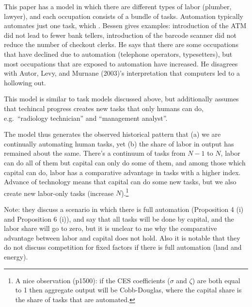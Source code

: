 \documentclass[
  11pt,
  letterpaper,
  DIV=11,
  numbers=noendperiod,
  oneside]{scrartcl}
\providecommand{\tightlist}{%
  \setlength{\itemsep}{0pt}\setlength{\parskip}{0pt}}\usepackage{longtable,booktabs,array}
\begin{document}
\begin{description}
\tightlist
\item[J. E. Bessen (2016), ``How computer automation affects
occupations: Technology, jobs, and skills'']
This paper has a model in which there are different types of labor
(plumber, lawyer), and each occupation consists of a bundle of tasks.
Automation typically automates just one task, which . Bessen gives
examples: introduction of the ATM did not lead to fewer bank tellers,
introduction of the barcode scanner did not reduce the number of
checkout clerks. He says that there are some occupations that have
declined due to automation (telephone operators, typesetters), but most
occupations that are exposed to automation have increased. He disagrees
with Autor, Levy, and Murnane (2003)'s interpretation that computers led
to a hollowing out.
\item[Acemoglu and Restrepo (2018) ``The Race Between Man and Machine:
Implications of Technology for Growth, Factor Shares, and Employment'']
This model is similar to task models discussed above, but additionally
assumes that techincal progress creates new tasks that only humans can
do, e.g.~``radiology technician'' and ``management analyst''.

The model thus generates the observed historical pattern that (a) we are
continually automating human tasks, yet (b) the share of labor in output
has remained about the same. There's a continuum of tasks from \(N-1\)
to \(N\), labor can do all of them but capital can only do some of them,
and among those which capital can do, labor has a comparative advantage
in tasks with a higher index. Advance of technology means that capital
can do some new tasks, but we also create new labor-only tasks (increase
\(N\)).\footnote{A nice observation (p1500): if the CES coefficients
  (\(\sigma\) and \(\zeta\)) are both equal to 1 then aggregate output
  will be Cobb-Douglas, where the capital share is the share of tasks
  that are automated.}

Note: they discuss a scenario in which there is full automation
(Proposition 4 (i) and Proposition 6 (i)), and say that all tasks will
be done by capital, and the labor share will go to zero, but it is
unclear to me why the comparative advantage between labor and capital
does not hold. Also it is notable that they do not discuss competition
for fixed factors if there is full automation (land and energy).
\end{description}
\end{document}
